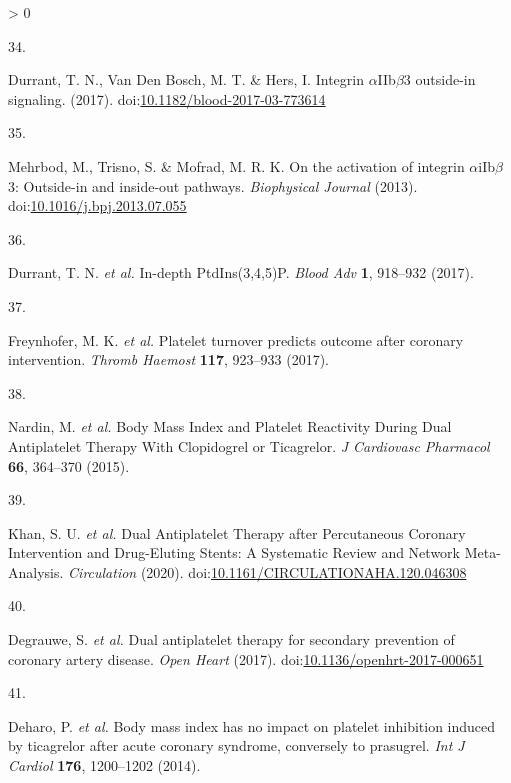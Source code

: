\documentclass[11pt,twoside]{bristolthesis}
\newlength{\cslhangindent}
\newlength{\csllabelwidth}
\newenvironment{CSLReferences}[2] %
 {%
  \setlength{\parindent}{0pt}
  \ifodd #1 \everypar{\setlength{\hangindent}{\cslhangindent}}\ignorespaces\fi
  \ifnum #2 > 0
  \setlength{\parskip}{#2\baselineskip}
  \fi
 }%
 {}
\newcommand{\CSLLeftMargin}[1]{\parbox[t]{\csllabelwidth}{#1}}
\newcommand{\CSLRightInline}[1]{\parbox[t]{\linewidth - \csllabelwidth}{#1}\break}
\begin{document}
\begin{CSLReferences}{0}{0}
\leavevmode\hypertarget{ref-Durrant2017a}{}%
\CSLLeftMargin{34. }
\CSLRightInline{Durrant, T. N., Van Den Bosch, M. T. \& Hers, I. {Integrin \(\alpha\)IIb\(\beta\)3 outside-in signaling}. (2017). doi:\href{https://doi.org/10.1182/blood-2017-03-773614}{10.1182/blood-2017-03-773614}}

\leavevmode\hypertarget{ref-Mehrbod2013}{}%
\CSLLeftMargin{35. }
\CSLRightInline{Mehrbod, M., Trisno, S. \& Mofrad, M. R. K. {On the activation of integrin \(\alpha\)iIb\(\beta\)3: Outside-in and inside-out pathways}. \emph{Biophysical Journal} (2013). doi:\href{https://doi.org/10.1016/j.bpj.2013.07.055}{10.1016/j.bpj.2013.07.055}}

\leavevmode\hypertarget{ref-Durrant2017}{}%
\CSLLeftMargin{36. }
\CSLRightInline{Durrant, T. N. \emph{et al.} {In-depth PtdIns(3,4,5)P}. \emph{Blood Adv} \textbf{1}, 918--932 (2017).}

\leavevmode\hypertarget{ref-Freynhofer2017a}{}%
\CSLLeftMargin{37. }
\CSLRightInline{Freynhofer, M. K. \emph{et al.} {Platelet turnover predicts outcome after coronary intervention}. \emph{Thromb Haemost} \textbf{117}, 923--933 (2017).}

\leavevmode\hypertarget{ref-Nardin2015}{}%
\CSLLeftMargin{38. }
\CSLRightInline{Nardin, M. \emph{et al.} {Body Mass Index and Platelet Reactivity During Dual Antiplatelet Therapy With Clopidogrel or Ticagrelor}. \emph{J Cardiovasc Pharmacol} \textbf{66}, 364--370 (2015).}

\leavevmode\hypertarget{ref-Khan2020}{}%
\CSLLeftMargin{39. }
\CSLRightInline{Khan, S. U. \emph{et al.} {Dual Antiplatelet Therapy after Percutaneous Coronary Intervention and Drug-Eluting Stents: A Systematic Review and Network Meta-Analysis}. \emph{Circulation} (2020). doi:\href{https://doi.org/10.1161/CIRCULATIONAHA.120.046308}{10.1161/CIRCULATIONAHA.120.046308}}

\leavevmode\hypertarget{ref-Degrauwe2017}{}%
\CSLLeftMargin{40. }
\CSLRightInline{Degrauwe, S. \emph{et al.} {Dual antiplatelet therapy for secondary prevention of coronary artery disease}. \emph{Open Heart} (2017). doi:\href{https://doi.org/10.1136/openhrt-2017-000651}{10.1136/openhrt-2017-000651}}

\leavevmode\hypertarget{ref-Deharo2014}{}%
\CSLLeftMargin{41. }
\CSLRightInline{Deharo, P. \emph{et al.} {Body mass index has no impact on platelet inhibition induced by ticagrelor after acute coronary syndrome, conversely to prasugrel}. \emph{Int J Cardiol} \textbf{176}, 1200--1202 (2014).}


\end{CSLReferences}
\end{document}

